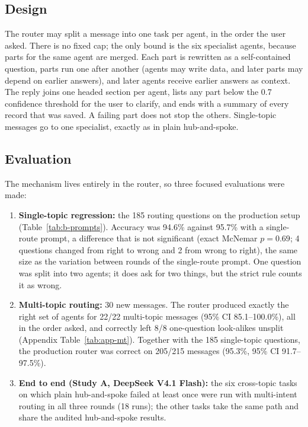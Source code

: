 \documentclass[11pt,a4paper]{article}
\begin{document}
\subsection{Design}
The router may split a message into one task per agent, in the order the user asked. There is no fixed cap; the only bound is the six specialist agents, because parts for the same agent are merged. Each part is rewritten as a self-contained question, parts run one after another (agents may write data, and later parts may depend on earlier answers), and later agents receive earlier answers as context. The reply joins one headed section per agent, lists any part below the 0.7 confidence threshold for the user to clarify, and ends with a summary of every record that was saved. A failing part does not stop the others. Single-topic messages go to one specialist, exactly as in plain hub-and-spoke.

\subsection{Evaluation}
The mechanism lives entirely in the router, so three focused evaluations were made:
\begin{enumerate}
\item \textbf{Single-topic regression:} the 185 routing questions on the production setup (Table~\ref{tab:b-prompts}). Accuracy was 94.6\% against 95.7\% with a single-route prompt, a difference that is not significant (exact McNemar $p=0.69$; 4 questions changed from right to wrong and 2 from wrong to right), the same size as the variation between rounds of the single-route prompt. One question was split into two agents; it does ask for two things, but the strict rule counts it as wrong.
\item \textbf{Multi-topic routing:} 30 new messages. The router produced exactly the right set of agents for 22/22 multi-topic messages (95\% CI 85.1--100.0\%), all in the order asked, and correctly left 8/8 one-question look-alikes unsplit (Appendix Table~\ref{tab:app-mt}). Together with the 185 single-topic questions, the production router was correct on 205/215 messages (95.3\%, 95\% CI 91.7--97.5\%).
\item \textbf{End to end (Study A, DeepSeek V4.1 Flash):} the six cross-topic tasks on which plain hub-and-spoke failed at least once were run with multi-intent routing in all three rounds (18 runs); the other tasks take the same path and share the audited hub-and-spoke results.
\end{enumerate}
\end{document}
